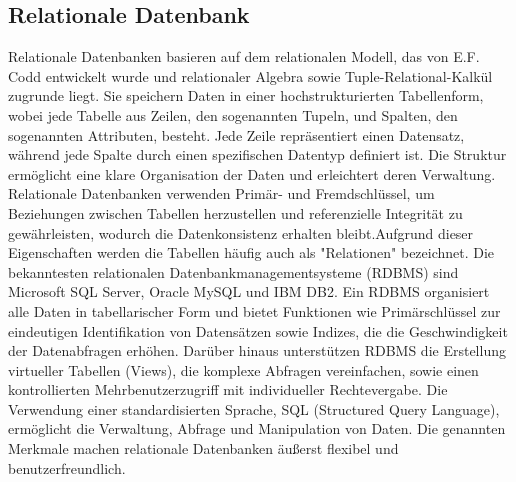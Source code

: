 \subsection{Relationale Datenbank} %
\label{sec:relationaleDatenbanken}
Relationale Datenbanken basieren auf dem relationalen Modell, das von E.F. Codd entwickelt wurde und relationaler Algebra sowie Tuple-Relational-Kalkül zugrunde liegt. Sie speichern Daten in einer hochstrukturierten Tabellenform, wobei jede Tabelle aus Zeilen, den sogenannten Tupeln, und Spalten, den sogenannten Attributen, besteht. Jede Zeile repräsentiert einen Datensatz, während jede Spalte durch einen spezifischen Datentyp definiert ist. Die Struktur ermöglicht eine klare Organisation der Daten und erleichtert deren Verwaltung. Relationale Datenbanken verwenden Primär- und Fremdschlüssel, um Beziehungen zwischen Tabellen herzustellen und referenzielle Integrität zu gewährleisten, wodurch die Datenkonsistenz erhalten bleibt.Aufgrund dieser Eigenschaften werden die Tabellen häufig auch als "Relationen" bezeichnet. Die bekanntesten relationalen Datenbankmanagementsysteme (RDBMS) sind Microsoft SQL Server, Oracle MySQL und IBM DB2. Ein RDBMS organisiert alle Daten in tabellarischer Form und bietet Funktionen wie Primärschlüssel zur eindeutigen Identifikation von Datensätzen sowie Indizes, die die Geschwindigkeit der Datenabfragen erhöhen. Darüber hinaus unterstützen RDBMS die Erstellung virtueller Tabellen (Views), die komplexe Abfragen vereinfachen, sowie einen kontrollierten Mehrbenutzerzugriff mit individueller Rechtevergabe. Die Verwendung einer standardisierten Sprache, SQL (Structured Query Language), ermöglicht die Verwaltung, Abfrage und Manipulation von Daten. Die genannten Merkmale machen relationale Datenbanken äußerst flexibel und benutzerfreundlich.
 \citep{relationalDatabase}  \citep{9677042}
